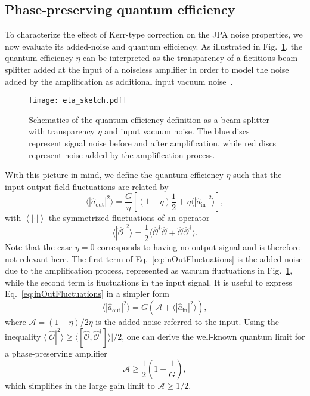 \documentclass[pra,twocolumn,superscriptaddress]{revtex4-1}
\newcommand{\ain}[0]{\hat{a}_{\mathrm{in}}}
\newcommand{\aout}[0]{\hat{a}_{\mathrm{out}}}
\newcommand{\parS}[1]{\left[#1\right]}
\newcommand{\parO}[1]{\left(#1\right)}
\newcommand{\abs}[1]{\left|#1\right|}
\newcommand{\average}[1]{\left\langle #1\right\rangle}
\newcommand{\Am}[0]{\mathcal{A}}
\newcommand{\Omh}[0]{\hat{\mathcal{O}}}
\begin{document}
\subsection{Phase-preserving quantum efficiency}

To characterize the effect of Kerr-type correction on the JPA noise properties, we now evaluate its added-noise and quantum efficiency. As illustrated in Fig.~\ref{fig:beamSplitterEta}, the quantum efficiency $\eta$ can be interpreted as the transparency of a fictitious beam splitter added at the input of a noiseless amplifier in order to model the 
noise added by the amplification as additional input vacuum noise~\cite{Leonhardt1994,Mallet:2011fk}.
% 
\begin{figure}[tb]
	\texttt{[image: eta\_sketch.pdf]}
	\caption{
		Schematics of the quantum efficiency definition as a beam splitter with transparency $\eta$ and input vacuum noise. The blue discs represent signal noise before and after amplification, while red discs represent noise added by the amplification process.
	}
	\label{fig:beamSplitterEta}
\end{figure}


With this picture in mind, we define the quantum efficiency $\eta$ such that the input-output field fluctuations are related by 
	\begin{equation}
		\langle |\aout|^2 \rangle = \frac{ G }{\eta} \parS{  \parO{ 1- \eta } \frac{ 1 }{2} + \eta \langle|\ain|^2 \rangle   },
		\label{eq:inOutFluctuations}
	\end{equation}
with $\average{\abs{\cdot}}$ the symmetrized fluctuations of an operator
% 
\begin{equation}
	\langle|\Omh|^2 \rangle = \frac{1}{2} \langle\Omh^\dag \Omh + \Omh \Omh^\dag\rangle.
	\label{eq:fluctuations}
\end{equation}
Note that the case $\eta=0$ corresponds to having no output signal and is therefore not relevant here. The first term of Eq.~\eqref{eq:inOutFluctuations} is the added noise due to the amplification process, represented as vacuum fluctuations in Fig.~\ref{fig:beamSplitterEta}, while the second term is fluctuations in the input signal.
It is useful to express Eq.~\eqref{eq:inOutFluctuations} in a simpler form
% 
\begin{equation}
	 \langle |\aout|^2 \rangle  = G\parO{\Am+ \langle |\ain |^2  \rangle },
	\label{eq::phasePreservingNoise}
\end{equation}
where $\Am = (1-\eta)/2\eta$ is the added noise referred to the input. 
Using the inequality 
$ \langle|\Omh|^2 \rangle
	\geq \langle [ \Omh ,  \Omh^\dag ]\rangle|/2$,
one can derive the well-known quantum limit for a phase-preserving amplifier~\cite{caves:1982a}
\begin{equation}
	\Am \geq \frac{1}{2}\parO{1 - \frac{1}{G}},
	\label{eq:ql} 
\end{equation}
which simplifies in the large gain limit to $\Am \geq 1/2$.
\end{document}
